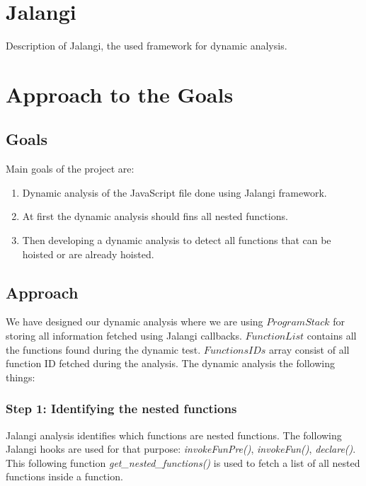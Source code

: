 \documentclass[accentcolor=tud0b,12pt,paper=a4]{tudreport}
\begin{document}
\chapter{Jalangi}
Description of Jalangi, the used framework for dynamic analysis.

\chapter{Approach to the Goals}
\section{Goals}
Main goals of the project are: 
\begin{enumerate}
	\item Dynamic analysis of the JavaScript file done using Jalangi framework.
	\item At first the dynamic analysis should fins all nested functions.
	\item Then developing a dynamic analysis to detect all functions that can be hoisted or are already hoisted.
\end{enumerate}
\section{Approach}
We have designed our dynamic analysis where we are using $Program Stack$ for storing all information fetched using Jalangi callbacks. $Function List$ contains all the functions found during the dynamic test. $Functions IDs$ array consist of all function ID fetched during the analysis. The dynamic analysis the following things:
\subsection{Step 1: Identifying the nested functions}
Jalangi analysis identifies which functions are nested functions. The following Jalangi hooks are used for that purpose: \emph{invokeFunPre()}, \emph{invokeFun()}, \emph{declare()}. 
This following function \emph{get\_nested\_functions()} is used to fetch a list of all nested functions inside a function.
\end{document}

